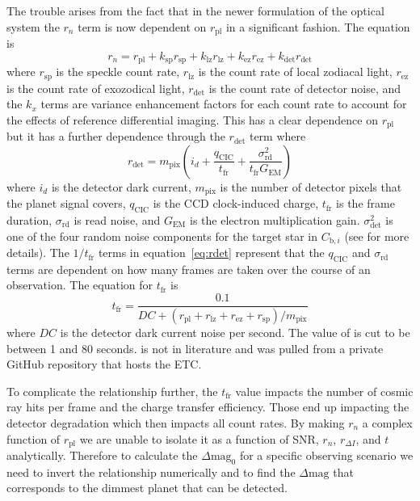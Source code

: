 The trouble arises from the fact that in the newer formulation of the optical
system the $r_n$ term is now dependent on $r_\textrm{pl}$ in a significant
fashion. The equation is
\begin{equation}
  r_n = r_\textrm{pl} + k_\textrm{sp} r_\textrm{sp} + k_\textrm{lz} r_\textrm{lz}+ k_\textrm{ez} r_\textrm{ez}+ k_\textrm{det} r_\textrm{det}
  \label{eq:rn}
\end{equation}
where $r_\textrm{sp}$ is the speckle count rate, $r_\textrm{lz}$ is the count
rate of local zodiacal light, $r_\textrm{ez}$ is the count rate of
exozodical light, $r_\textrm{det}$ is the count rate of detector noise, and the
$k_x$ terms are variance enhancement factors for each count rate to account for
the effects of reference differential imaging. This has a clear dependence on
$r_\textrm{pl}$ but it has a further dependence through the $r_\textrm{det}$ term
where
\begin{equation}
  r_\textrm{det} =  m_\textrm{pix}\left( i_d +
  \frac{q_\textrm{CIC}}{t_\textrm{fr}} +
\frac{\sigma^2_\textrm{rd}}{t_\textrm{fr} G_\textrm{EM}} \right)
  \label{eq:rdet}
\end{equation}
where $i_d$ is the detector dark current, $m_{\textrm{pix}}$ is the number of
detector pixels that the planet signal covers, $q_{\textrm{CIC}}$ is the CCD
clock-induced charge, $t_{\textrm{fr}}$ is the frame duration,
$\sigma_{\textrm{rd}}$ is read noise, and $G_{\textrm{EM}}$ is the electron
multiplication gain. $\sigma_{\textrm{det}}^2$ is one of the four random noise
components for the target star in $C_{\textrm{b},i}$ (see \citet{Nemati2020a}
for more details). The $1/t_{\textrm{fr}}$ terms in
equation~\ref{eq:rdet} represent that the $q_\textrm{CIC}$
and $\sigma_\textrm{rd}$ terms are dependent on how many frames are taken over
the course of an observation. The equation for $t_\textrm{fr}$ is 
\begin{equation}
  t_{\textrm{fr}} = \frac{0.1}{DC +\left(r_{\textrm{pl}}+r_{\textrm{lz}}+r_{\textrm{ez}}+r_{\textrm{sp}}\right)/m_{\textrm{pix}}}
  \label{eq:bijan_frame_duration}
\end{equation}
where $DC$ is the detector dark current noise per second. The value of
 is cut to be between 1 and 80 seconds.
 is not in literature and was pulled from a
private GitHub repository that hosts the ETC.

To complicate the relationship further, the $t_{\textrm{fr}}$ value impacts the
number of cosmic ray hits per frame and the charge transfer efficiency. Those
end up impacting the detector degradation which then impacts all count
rates. 
By making $r_n$ a complex function of $r_\textrm{pl}$ we are unable to isolate
it as a function of SNR, $r_n$, $r_{\Delta I}$, and $t$ analytically. Therefore
to calculate the $\Delta\textrm{mag}_0$ for a specific observing scenario we
need to invert the relationship numerically and to find the $\Delta\textrm{mag}$
that corresponds to the dimmest planet that can be detected.

